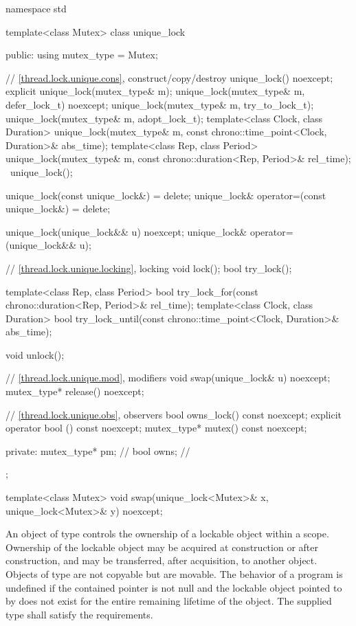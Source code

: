%
\begin{codeblock}
namespace std {
  template<class Mutex>
  class unique_lock {
  public:
    using mutex_type = Mutex;

    // \ref{thread.lock.unique.cons}, construct/copy/destroy
    unique_lock() noexcept;
    explicit unique_lock(mutex_type& m);
    unique_lock(mutex_type& m, defer_lock_t) noexcept;
    unique_lock(mutex_type& m, try_to_lock_t);
    unique_lock(mutex_type& m, adopt_lock_t);
    template<class Clock, class Duration>
      unique_lock(mutex_type& m, const chrono::time_point<Clock, Duration>& abs_time);
    template<class Rep, class Period>
      unique_lock(mutex_type& m, const chrono::duration<Rep, Period>& rel_time);
    ~unique_lock();

    unique_lock(const unique_lock&) = delete;
    unique_lock& operator=(const unique_lock&) = delete;

    unique_lock(unique_lock&& u) noexcept;
    unique_lock& operator=(unique_lock&& u);

    // \ref{thread.lock.unique.locking}, locking
    void lock();
    bool try_lock();

    template<class Rep, class Period>
      bool try_lock_for(const chrono::duration<Rep, Period>& rel_time);
    template<class Clock, class Duration>
      bool try_lock_until(const chrono::time_point<Clock, Duration>& abs_time);

    void unlock();

    // \ref{thread.lock.unique.mod}, modifiers
    void swap(unique_lock& u) noexcept;
    mutex_type* release() noexcept;

    // \ref{thread.lock.unique.obs}, observers
    bool owns_lock() const noexcept;
    explicit operator bool () const noexcept;
    mutex_type* mutex() const noexcept;

  private:
    mutex_type* pm;             // \expos
    bool owns;                  // \expos
  };

  template<class Mutex>
    void swap(unique_lock<Mutex>& x, unique_lock<Mutex>& y) noexcept;
}
\end{codeblock}

\pnum
An object of type  controls the ownership of a lockable
object within a scope. Ownership of the lockable object may be acquired at
construction or after construction, and may be transferred, after
acquisition, to another  object. Objects of type  are not
copyable but are movable. The behavior of a program is undefined if the contained pointer
 is not null and the lockable object pointed
to by  does not exist for the entire remaining
lifetime of the  object. The supplied
 type shall satisfy the 
requirements.

